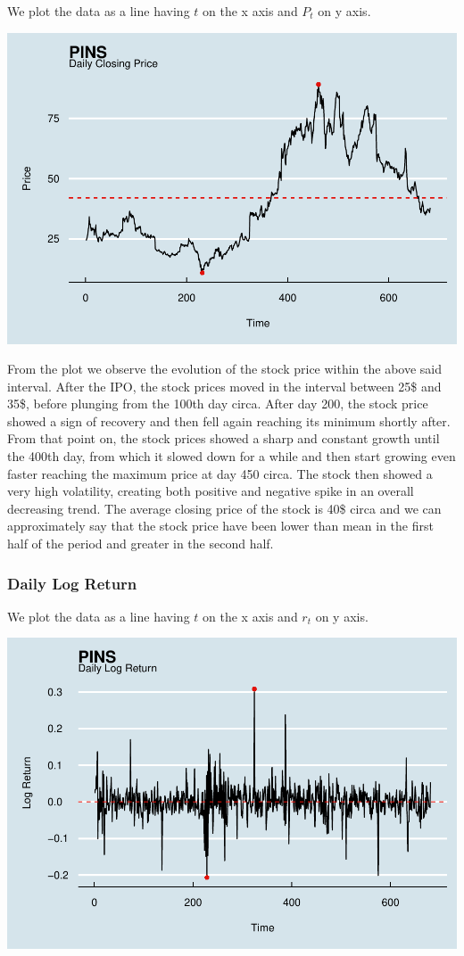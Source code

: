 \documentclass[
]{article}
\begin{document}
We plot the data as a line having \(t\) on the x axis and \(P_t\) on y
axis.

\includegraphics[width=0.8\linewidth]{StatsAssignment_files/figure-latex/plot-1}

From the plot we observe the evolution of the stock price within the
above said interval. After the IPO, the stock prices moved in the
interval between 25\$ and 35\$, before plunging from the 100th day
circa. After day 200, the stock price showed a sign of recovery and then
fell again reaching its minimum shortly after. From that point on, the
stock prices showed a sharp and constant growth until the 400th day,
from which it slowed down for a while and then start growing even faster
reaching the maximum price at day 450 circa. The stock then showed a
very high volatility, creating both positive and negative spike in an
overall decreasing trend. The average closing price of the stock is 40\$
circa and we can approximately say that the stock price have been lower
than mean in the first half of the period and greater in the second
half.

\hypertarget{daily-log-return}{%
\subsubsection{Daily Log Return}\label{daily-log-return}}

We plot the data as a line having \(t\) on the x axis and \(r_t\) on y
axis.

\includegraphics[width=0.8\linewidth]{StatsAssignment_files/figure-latex/log return-1}
\end{document}
